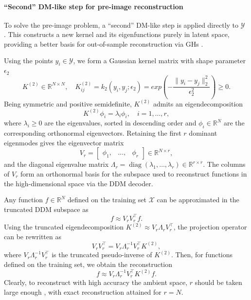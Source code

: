 \documentclass{article}
\begin{document}
\paragraph{``Second'' DM-like step for pre-image reconstruction} To solve the pre-image problem, a ``second'' DM-like step is applied directly to $\mathcal{Y}$ \cite{evangelou2022double}. This constructs a new kernel and its eigenfunctions purely in latent space, providing a better basis for out-of-sample reconstruction via GHs \cite{coifman2005geometric,coifman2006geometric,evangelou2022double}.

Using the points $y_i \in \mathcal{Y}$, we form a Gaussian kernel matrix with shape parameter $\epsilon_2$
\begin{equation}
K^{(2)} \in \mathbb{R}^{N \times N}, \quad K_{ij}^{(2)} = k_2(y_i, y_j; \epsilon_2) = exp\left(-\dfrac{\lVert y_i-y_j\rVert_2^2}{\epsilon_2^2}\right) \ge 0.
\label{eq:DDMkernel}
\end{equation}
Being symmetric and positive semidefinite, $K^{(2)}$ admits an eigendecomposition
\begin{equation}
K^{(2)} \phi_{i} = \lambda_i \phi_{i}, \quad i = 1, \dots, r,
\end{equation}
where $\lambda_i\ge0$ are the eigenvalues, sorted in descending order and $\phi_i\in\mathbb{R}^N$ are the corresponding orthonormal eigenvectors. Retaining the first $r$ dominant eigenmodes gives the eigenvector matrix
\begin{equation}
V_r = \begin{bmatrix}
    \phi_{1}, & \ldots, & \phi_{r}
\end{bmatrix} \in \mathbb{R}^{N \times r},
\end{equation}
and the diagonal eigenvalue matrix $\Lambda_r = \operatorname{diag}(\lambda_1,\ldots,\lambda_r) \in \mathbb{R}^{r \times r}$. The columns of $V_r$ form an orthonormal basis for the subspace used to reconstruct functions in the high-dimensional space via the DDM decoder. 

Any function $f \in \mathbb{R}^N$ defined on the training set $\mathcal{X}$ can be approximated in the truncated DDM subspace as
\begin{equation}
f \approx V_r V_r^\top f.
\label{eq:proj_train}
\end{equation}
Using the truncated eigendecomposition $K^{(2)} \approx V_r \Lambda_r V_r^\top$, the projection operator can be rewritten as
\begin{equation}
V_r V_r^\top
= V_r \Lambda_r^{-1} V_r^\top K^{(2)},
\label{eq:proj_kernel}
\end{equation}
where $V_r \Lambda_r^{-1} V_r^\top$ is the truncated pseudo-inverse of $K^{(2)}$. Then, for functions defined on the training set, we obtain the reconstruction
\begin{equation}
f \approx V_r \Lambda_r^{-1} V_r^\top K^{(2)} f.
\label{eq:recon_train}
\end{equation}
Clearly, to reconstruct with high accuracy the ambient space, $r$ should be taken large enough \cite{evangelou2022double,Patsatzis_2023}, with exact reconstruction attained for $r=N$.
\end{document}

